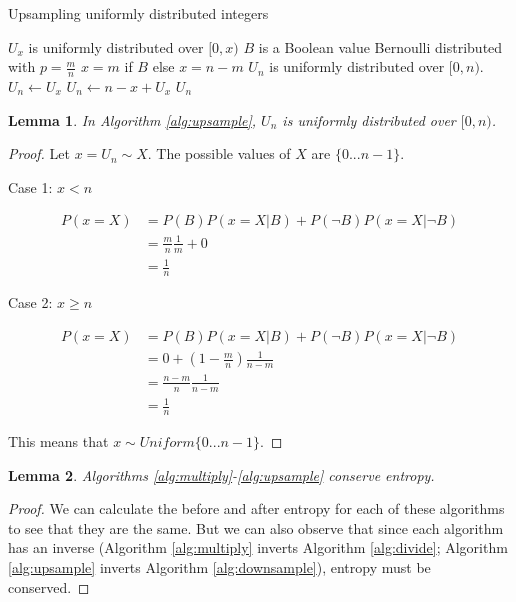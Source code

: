 \documentclass[12pt]{article}
\newtheorem{lemma}{Lemma}
\begin{document}
\begin{algorithm}
\caption{Upsampling uniformly distributed integers}
\label{alg:upsample}
\begin{algorithmic}[1]
\Require $U_x$ is uniformly distributed over $[0,x)$
\Require $B$ is a Boolean value Bernoulli distributed with $p=\frac{m}{n}$
\Require $x=m$ if $B$ else $x=n-m$
\Ensure $U_n$ is uniformly distributed over $[0,n)$.
    \State $U_n \gets U_x$  
  \Else
    \State $U_n \gets n-x+U_x$  
  \EndIf
  \State \Return $U_n$
\EndProcedure
\end{algorithmic}
\end{algorithm}

\begin{lemma}
In Algorithm \ref{alg:upsample}, $U_{n}$ is uniformly distributed over $[0,n)$.
\end{lemma}

\begin{proof}
Let $x = U_{n} \sim X$. The possible values of $X$ are $\{0 ... n-1\}$.

Case 1: $x<n$

\begin{align}
P(x=X) & = P(B)P(x=X|B) + P(\neg B)P(x=X|\neg B) \\
       & = \frac{m}{n}\frac{1}{m} + 0 \\
       & = \frac{1}{n}
\end{align}

Case 2: $x \ge n$

\begin{align}
P(x=X) & = P(B)P(x=X|B) + P(\neg B)P(x=X|\neg B) \\
       & = 0 + (1 - \frac{m}{n})\frac{1}{n-m}  \\
       & = \frac{n - m}{n}\frac{1}{n-m} \\
       & = \frac{1}{n}
\end{align}

This means that $x \sim Uniform\{0...n-1\}$.
\end{proof}

\begin{lemma}
\label{lem:conservation}
Algorithms \ref{alg:multiply}-\ref{alg:upsample} conserve entropy.
\end{lemma}

\begin{proof}
We can calculate the before and after entropy for each of these algorithms to see that they are the same. But we can also observe that since each algorithm has an inverse (Algorithm \ref{alg:multiply} inverts Algorithm \ref{alg:divide}; Algorithm \ref{alg:upsample} inverts Algorithm \ref{alg:downsample}), entropy must be conserved.
\end{proof}
\end{document}
